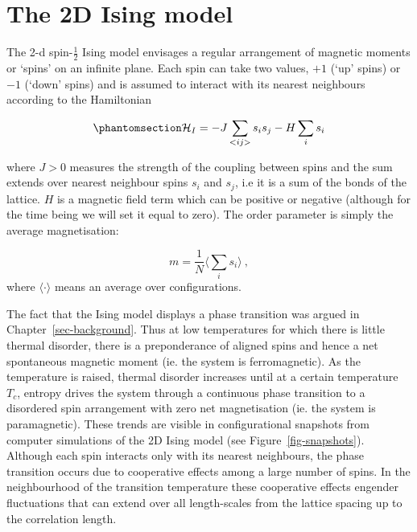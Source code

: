 \documentclass[
  letterpaper,
  enabledeprecatedfontcommands]{report}
\begin{document}
\section{The 2D Ising model}\label{the-2d-ising-model}

The 2-d spin-\(\frac{1}{2}\) Ising model envisages a regular arrangement
of magnetic moments or `spins' on an infinite plane. Each spin can take
two values, \(+1\) (`up' spins) or \(-1\) (`down' spins) and is assumed
to interact with its nearest neighbours according to the Hamiltonian

\begin{equation}\phantomsection\label{eq-ising}{
{\cal H}_I=-J\sum_{<ij>}s_is_j - H\sum_i s_i
}\end{equation}

where \(J>0\) measures the strength of the coupling between spins and
the sum extends over nearest neighbour spins \(s_i\) and \(s_j\), i.e it
is a sum of the bonds of the lattice. \(H\) is a magnetic field term
which can be positive or negative (although for the time being we will
set it equal to zero). The order parameter is simply the average
magnetisation:

\[m=\frac{1}{N} \langle \sum_i s_i \rangle\:,\] where
\(\langle\cdot\rangle\) means an average over configurations.

The fact that the Ising model displays a phase transition was argued in
Chapter~\ref{sec-background}. Thus at low temperatures for which there
is little thermal disorder, there is a preponderance of aligned spins
and hence a net spontaneous magnetic moment (ie. the system is
ferromagnetic). As the temperature is raised, thermal disorder increases
until at a certain temperature \(T_c\), entropy drives the system
through a continuous phase transition to a disordered spin arrangement
with zero net magnetisation (ie. the system is paramagnetic). These
trends are visible in configurational snapshots from computer
simulations of the 2D Ising model (see Figure~\ref{fig-snapshots}).
Although each spin interacts only with its nearest neighbours, the phase
transition occurs due to cooperative effects among a large number of
spins. In the neighbourhood of the transition temperature these
cooperative effects engender fluctuations that can extend over all
length-scales from the lattice spacing up to the correlation length.
\end{document}
